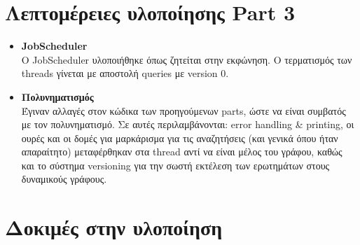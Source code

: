 \documentclass[12pt]{article}
\begin{document}
\section{Λεπτομέρειες υλοποίησης Part 3}
\begin{itemize}
\item \textbf{JobScheduler}\\
Ο JobScheduler υλοποιήθηκε όπως ζητείται στην εκφώνηση. Ο τερματισμός των threads γίνεται με αποστολή queries με version 0.
\item \textbf{Πολυνηματισμός}\\
Έγιναν αλλαγές στον κώδικα των προηγούμενων parts, ώστε να είναι συμβατός με τον πολυνηματισμό. Σε αυτές περιλαμβάνονται: error handling \& printing, οι ουρές και οι δομές για μαρκάρισμα για τις αναζητήσεις (και γενικά όπου ήταν απαραίτητο) μεταφέρθηκαν στα thread αντί να είναι μέλος του γράφου, καθώς και το σύστημα versioning για την σωστή εκτέλεση των ερωτημάτων στους δυναμικούς γράφους.
\end{itemize}
\section{Δοκιμές στην υλοποίηση}
\end{document}
